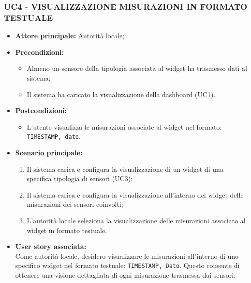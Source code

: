 \subsubsection{UC4 - VISUALIZZAZIONE MISURAZIONI IN FORMATO TESTUALE}
\begin{itemize}
      \item \textbf{Attore principale:} Autorità locale;
      \item \textbf{Precondizioni:}
            \begin{itemize}
                  \item Almeno un sensore della tipologia associata al widget ha trasmesso dati al sistema;
                  \item Il sistema ha caricato la visualizzazione della dashboard (UC1). 
            \end{itemize}
      \item \textbf{Postcondizioni:}
            \begin{itemize}
                  \item L'utente visualizza le misurazioni associate al widget nel formato: \texttt{TIMESTAMP, dato}.
            \end{itemize}
      \item \textbf{Scenario principale:}
            \begin{enumerate}
                  \item Il sistema carica e configura la visualizzazione di un widget di una specifica tipologia di sensori (UC3);
                  \item Il sistema carica e configura la visualizzazione all'interno del widget delle misurazioni dei sensori coinvolti;
                  \item L'autorità locale seleziona la visualizzazione delle misurazioni associato al widget in formato testuale.
            \end{enumerate}
      \item \textbf{User story associata:} \\
            Come autorità locale, desidero visualizzare le misurazioni all'interno di uno specifico widget nel formato testuale: \texttt{TIMESTAMP, Dato}. Questo consente di ottenere una visione dettagliata di ogni misurazione trasmessa dai sensori.
\end{itemize}